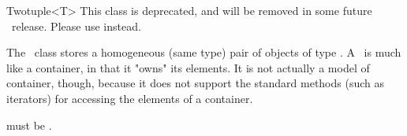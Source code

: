 \begin{ccRefClass}{Twotuple<T>}
  This class is deprecated, and will be removed in some future \cgal\ release.
  Please use  instead.

  \begin{ccDeprecated}
  \ccDefinition The \ccRefName\ class stores a homogeneous (same type) pair
  of objects of type .  A \ccRefName\ is much like a container, in that
  it "owns" its elements. It is not actually a model of container, though,
  because it does not support the standard methods (such as iterators) for
  accessing the elements of a container.

  
  \ccRequirements {} must be .


  \ccTypes

  \ccGlue

  \ccCreation
  
  
  \end{ccDeprecated}
\end{ccRefClass}


